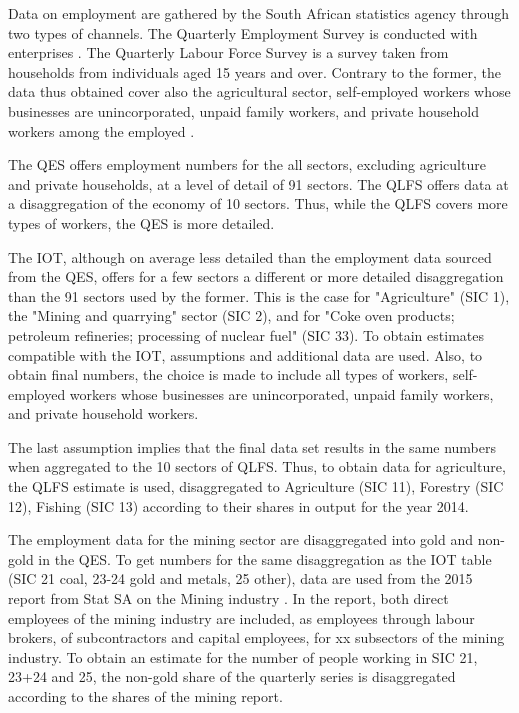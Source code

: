 \documentclass[12pt,english]{article}
\newcommand\lies[2][]{\todo[color=orange!50,#1]{ldf: #2}}
\begin{document}
Data on employment are gathered by the South African statistics agency through two types of channels. The Quarterly Employment Survey is conducted with enterprises \citep{QES2018}. The Quarterly Labour Force Survey is a survey taken from households from individuals aged 15 years and over. Contrary to the former, the data thus obtained cover also the agricultural sector, self-employed workers whose businesses are unincorporated, unpaid family workers, and private household workers among the employed \citep{QLFS2018}.

The QES offers employment numbers for the all sectors, excluding agriculture and private households, at a level of detail of 91 sectors. The QLFS offers data at a disaggregation of the economy of 10 sectors. Thus, while the QLFS covers more types of workers, the QES is more detailed.

The IOT, although on average less detailed than the employment data sourced from the QES, offers for a few sectors a different or more detailed disaggregation than the 91 sectors used by the former. This is the case for "Agriculture" (SIC 1), the "Mining and quarrying" sector (SIC 2), and for "Coke oven products; petroleum refineries; processing of nuclear fuel" (SIC 33). To obtain estimates compatible with the IOT, assumptions and additional data are used. Also, to obtain final numbers, the choice is made to include all types of workers, self-employed workers whose businesses are unincorporated, unpaid family workers, and private household workers. %
 
The last assumption implies that the final data set results in the same numbers when aggregated to the 10 sectors of QLFS. Thus, to obtain data for agriculture, the QLFS estimate is used, disaggregated to Agriculture (SIC 11), Forestry (SIC 12), Fishing (SIC 13) according to their shares in output for the year 2014. 

The employment data for the mining sector are disaggregated into gold and non-gold in the QES. To get numbers for the same disaggregation as the IOT table (SIC 21 coal, 23-24 gold and metals, 25 other), data are used from the 2015 report from Stat SA on the Mining industry \citep{mining2015}. In the report, both direct employees of the mining industry are included, as employees through labour brokers, of subcontractors and capital employees\lies{what are those?}, for xx subsectors of the mining industry. %
To obtain an estimate for the number of people working in SIC 21, 23+24 and 25, the non-gold share of the quarterly series is disaggregated according to the shares of the mining report. 
\end{document}
